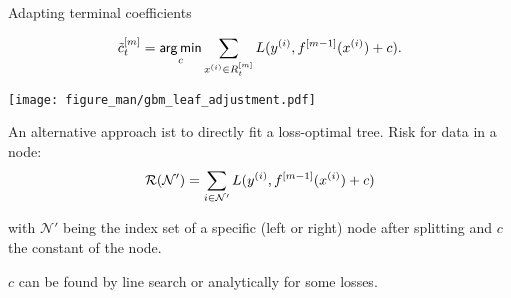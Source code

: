 \begin{vbframe}{Adapting terminal coefficients}
\begin{small}

$$ \tilde{c}_t^{[m]} = \mathop{\sf arg\,min}_{c} \sum_{x^{(i)} \in R_{t}^{[m]}} L(y^{(i)}, f^{[m-1]}(x^{(i)}) + c). $$

\vspace{-0.5cm}

\begin{center}

\texttt{[image: figure\_man/gbm\_leaf\_adjustment.pdf]}

\end{center}

\end{small}

\framebreak

An alternative approach ist to directly fit a loss-optimal tree.
Risk for data in a node:
$$
\mathcal{R}(\mathcal{N}') = \sum_{i \in \mathcal{N}'} L(y^{(i)}, f^{[m-1]}(x^{(i)}) + c)
$$

with $\mathcal{N}'$ being the index set of a specific (left or right) node after splitting and $c$ the constant of the node.

\vfill

$c$ can be found by line search or analytically for some losses.
% 

\end{vbframe}



